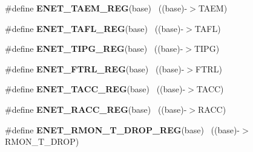 \begin{DoxyCompactItemize}
\item 
\hypertarget{group___e_n_e_t___register___accessor___macros_ga6bb0a12220853d740cdd95e037e038e0}{}\#define {\bfseries E\+N\+E\+T\+\_\+\+T\+A\+E\+M\+\_\+\+R\+E\+G}(base)                                        ~((base)-\/$>$T\+A\+E\+M)\label{group___e_n_e_t___register___accessor___macros_ga6bb0a12220853d740cdd95e037e038e0}

\item 
\hypertarget{group___e_n_e_t___register___accessor___macros_ga2cf510e72c8eefe1a918428d4dd5a055}{}\#define {\bfseries E\+N\+E\+T\+\_\+\+T\+A\+F\+L\+\_\+\+R\+E\+G}(base)                                        ~((base)-\/$>$T\+A\+F\+L)\label{group___e_n_e_t___register___accessor___macros_ga2cf510e72c8eefe1a918428d4dd5a055}

\item 
\hypertarget{group___e_n_e_t___register___accessor___macros_gaf07e5059b7b9d9b6e6138433a58281bf}{}\#define {\bfseries E\+N\+E\+T\+\_\+\+T\+I\+P\+G\+\_\+\+R\+E\+G}(base)                                        ~((base)-\/$>$T\+I\+P\+G)\label{group___e_n_e_t___register___accessor___macros_gaf07e5059b7b9d9b6e6138433a58281bf}

\item 
\hypertarget{group___e_n_e_t___register___accessor___macros_ga13e256be71ce3e482a0a97d112ee8e7b}{}\#define {\bfseries E\+N\+E\+T\+\_\+\+F\+T\+R\+L\+\_\+\+R\+E\+G}(base)                                        ~((base)-\/$>$F\+T\+R\+L)\label{group___e_n_e_t___register___accessor___macros_ga13e256be71ce3e482a0a97d112ee8e7b}

\item 
\hypertarget{group___e_n_e_t___register___accessor___macros_ga9a2b1891be0f0dc8fef9c5193c4c406b}{}\#define {\bfseries E\+N\+E\+T\+\_\+\+T\+A\+C\+C\+\_\+\+R\+E\+G}(base)                                        ~((base)-\/$>$T\+A\+C\+C)\label{group___e_n_e_t___register___accessor___macros_ga9a2b1891be0f0dc8fef9c5193c4c406b}

\item 
\hypertarget{group___e_n_e_t___register___accessor___macros_ga47e4d722e3dd64b70537a73a74827839}{}\#define {\bfseries E\+N\+E\+T\+\_\+\+R\+A\+C\+C\+\_\+\+R\+E\+G}(base)                                        ~((base)-\/$>$R\+A\+C\+C)\label{group___e_n_e_t___register___accessor___macros_ga47e4d722e3dd64b70537a73a74827839}

\item 
\hypertarget{group___e_n_e_t___register___accessor___macros_ga31bd9c3b9e46a580c6e59f3e68509c21}{}\#define {\bfseries E\+N\+E\+T\+\_\+\+R\+M\+O\+N\+\_\+\+T\+\_\+\+D\+R\+O\+P\+\_\+\+R\+E\+G}(base)                          ~((base)-\/$>$R\+M\+O\+N\+\_\+\+T\+\_\+\+D\+R\+O\+P)\label{group___e_n_e_t___register___accessor___macros_ga31bd9c3b9e46a580c6e59f3e68509c21}


\end{DoxyCompactItemize}
